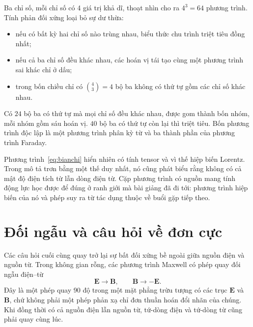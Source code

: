 Ba chỉ số, mỗi chỉ số có 4 giá trị khả dĩ, thoạt nhìn cho ra
\(4^3=64\) phương trình. Tính phản đối xứng loại bỏ sự dư thừa:
\begin{itemize}
\item nếu có bất kỳ hai chỉ số nào trùng nhau, biểu thức chu trình triệt tiêu đồng nhất;
\item nếu cả ba chỉ số đều khác nhau, các hoán vị tái tạo cùng một phương trình sai khác chỉ ở dấu;
\item trong bốn chiều chỉ có
\(\binom{4}{3}=4\) bộ ba không có thứ tự gồm các chỉ số khác nhau.
\end{itemize}
Có \(24\) bộ ba có thứ tự mà mọi chỉ số đều khác nhau, được gom thành bốn nhóm, mỗi nhóm gồm sáu hoán vị. \(40\) bộ ba có thứ tự còn lại thì triệt tiêu. Bốn phương trình độc lập là một phương trình phân kỳ từ và ba thành phần của phương trình Faraday.

\begin{classroomqa}
\end{classroomqa}

Phương trình~\eqref{eq:bianchi} hiển nhiên có tính tensor và vì thế hiệp biến Lorentz. Trong mô tả trơn bằng một thế duy nhất, nó cũng phát biểu rằng không có cả mật độ điện tích từ lẫn dòng điện từ. Cặp phương trình có nguồn mang tính động lực học được để đúng ở ranh giới mà bài giảng đã đi tới: phương trình hiệp biến của nó và phép suy ra từ tác dụng thuộc về buổi gặp tiếp theo.

\section{Đối ngẫu và câu hỏi về đơn cực}

Các câu hỏi cuối cùng quay trở lại sự bất đối xứng bề ngoài giữa nguồn điện và nguồn từ. Trong không gian rỗng, các phương trình Maxwell có phép quay đối ngẫu điện--từ
\begin{equation}
\mathbf E\longrightarrow\mathbf B,
\qquad
\mathbf B\longrightarrow-\mathbf E.
\label{eq:duality-quarter-turn}
\end{equation}
Đây là một phép quay 90 độ trong một mặt phẳng trừu tượng có các trục
\(\mathbf E\) và \(\mathbf B\), chứ không phải một phép phản xạ chỉ đơn thuần hoán đổi nhãn của chúng. Khi đồng thời có cả nguồn điện lẫn nguồn từ, tứ-dòng điện và tứ-dòng từ cũng phải quay cùng lúc.

